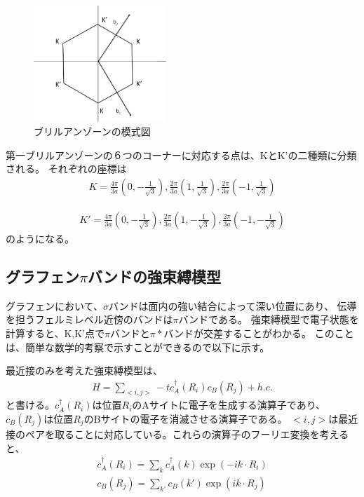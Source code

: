 \documentclass{article}
\begin{document}
\begin{figure}[htbp]
\begin{center}
\includegraphics[width=5cm]{Brillouin.eps}
\end{center}
\label{zone}
\caption{ブリルアンゾーンの模式図}
\end{figure}
第一ブリルアンゾーンの６つのコーナーに対応する点は、KとK'の二種類に分類される。
それぞれの座標は
\begin{eqnarray}
K=\frac{4\pi}{3a}(0,-\frac{1}{\sqrt{3}}),\frac{2\pi}{3a}(1,\frac{1}{\sqrt{3}}),\frac{2\pi}{3a}(-1,\frac{1}{\sqrt{3}}) 
\end{eqnarray}

\begin{eqnarray}
K'=\frac{4\pi}{3a}(0,-\frac{1}{\sqrt{3}}),\frac{2\pi}{3a}(1,-\frac{1}{\sqrt{3}}),\frac{2\pi}{3a}(-1,-\frac{1}{\sqrt{3}}) 
\end{eqnarray}
のようになる。

\subsection{グラフェン$\pi$バンドの強束縛模型}
グラフェンにおいて、$\sigma$バンドは面内の強い結合によって深い位置にあり、
伝導を担うフェルミレベル近傍のバンドは$\pi$バンドである。
強束縛模型で電子状態を計算すると、K,K'点で$\pi$バンドと$\pi*$バンドが交差することがわかる。
このことは、簡単な数学的考察で示すことができるので以下に示す。

最近接のみを考えた強束縛模型は、
\begin{eqnarray}
H=\sum_{<i,j>} -t c_A^\dagger(R_i)c_B(R_j) +h.c.
\end{eqnarray}
と書ける。$c_A^\dagger(R_i)$は位置$R_i$のAサイトに電子を生成する演算子であり、
$c_B(R_j)$は位置$R_j$のBサイトの電子を消滅させる演算子である。
$<i,j>$は最近接のペアを取ることに対応している。これらの演算子のフーリエ変換を考えると、
\begin{eqnarray}
c_A^\dagger(R_i)=\sum_{k}c_A^\dagger (k) \exp(-ik\cdot R_i)\\
c_B(R_j)=\sum_{k'}c_B(k') \exp(ik\cdot R_j)
\end{eqnarray}
\end{document}
